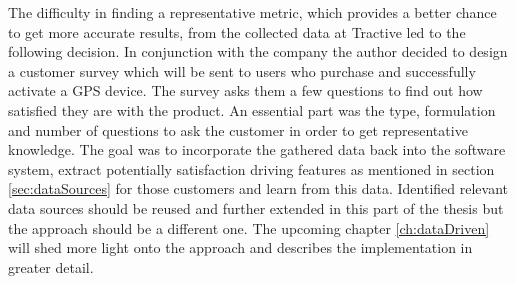 The difficulty in finding a representative metric, which provides a better chance to get more accurate results, from the collected data at Tractive led to the following decision. In conjunction with the company the author decided to design a customer survey which will be sent to users who purchase and successfully activate a GPS device. The survey asks them a few questions to find out how satisfied they are with the product. An essential part was the type, formulation and number of questions to ask the customer in order to get representative knowledge. The goal was to incorporate the gathered data back into the software system, extract potentially satisfaction driving features as mentioned in section \ref{sec:dataSources} for those customers and learn from this data. Identified relevant data sources should be reused and further extended in this part of the thesis but the approach should be a different one. The upcoming chapter \ref{ch:dataDriven} will shed more light onto the approach and describes the implementation in greater detail. 




 

